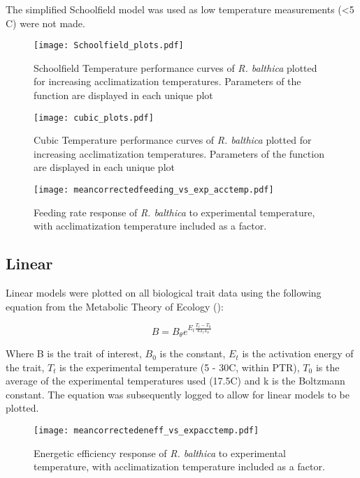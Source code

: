 \documentclass[../../Paper.tex]{subfiles}
\begin{document}
The simplified Schoolfield model was used
as low temperature measurements (\textless 5 \degree C) were not made. 


\begin{figure*}[!t]
\centering
\texttt{[image: Schoolfield\_plots.pdf]}
\caption{Schoolfield Temperature performance curves of \textit{R. balthica} plotted for increasing 
acclimatization temperatures. Parameters of the function are displayed in each 
unique plot}
\end{figure*}

\begin{figure*}[!t]
\centering
\texttt{[image: cubic\_plots.pdf]}
\caption{Cubic Temperature performance curves of \textit{R. balthica} plotted for increasing 
acclimatization temperatures. Parameters of the function are displayed in each 
unique plot}
\end{figure*}

\begin{figure*}[!b]

\centering
\texttt{[image: meancorrectedfeeding\_vs\_exp\_acctemp.pdf]}
\caption{Feeding rate response of \textit{R. balthica} to experimental temperature, with    
acclimatization temperature included as a factor.}
\end{figure*}

\subsection*{Linear}

Linear models were plotted on all biological trait data using 
the following equation from the Metabolic Theory of Ecology 
(\cite{gillooly_effects_2001,savage_effects_2004}):

\begin{equation}
B = B_{\theta} e^{E_t\frac{T_t - T_0}{kT_tT_0}}
\end{equation}

Where B is the trait of interest, $B_0$ is the constant, $E_t$ is the 
activation energy of the trait, $T_t$ is the experimental temperature (5 - 
30\degree C, within PTR), $T_0$ is the average of the experimental temperatures used (17.5\degree C) and k is the Boltzmann constant. The equation was subsequently logged to allow for linear models to be plotted.


\begin{figure*}[!b]

\centering
\texttt{[image: meancorrectedeneff\_vs\_expacctemp.pdf]}
\caption{Energetic efficiency response of \textit{R. balthica} to experimental temperature, with    
acclimatization temperature included as a factor.}
\end{figure*}
\end{document}
